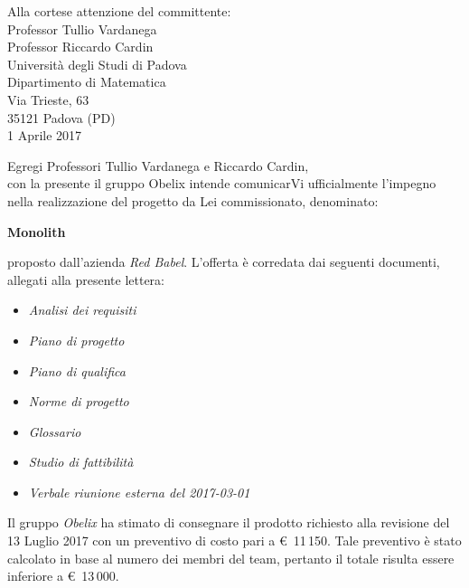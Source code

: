 \documentclass[10 pt,a4paper]{article}
\begin{document}
\begin{flushright}
  Alla cortese attenzione del committente: \\
\vspace{0.08in}
  Professor Tullio Vardanega \\
  Professor Riccardo Cardin \\
  Università degli Studi di Padova \\
  Dipartimento di Matematica \\
  Via Trieste, 63 \\
  35121 Padova (PD)\\
\vspace{0.08in}
  1 Aprile 2017 \\
\end{flushright}
\vspace{0.5in}
Egregi Professori Tullio Vardanega e Riccardo Cardin,\\
con la presente il gruppo Obelix intende comunicarVi ufficialmente
l'impegno nella realizzazione del progetto da Lei commissionato,
denominato:\\
\vspace{.05in}
\begin{centering}

  \textbf{Monolith}%
\\
\vspace{.1in}
\end{centering}
proposto dall’azienda
\emph{Red Babel}.
L'offerta è corredata dai seguenti documenti, allegati alla presente lettera:
\begin{itemize}
\item \emph{Analisi dei requisiti}
\item \emph{Piano di progetto}
\item \emph{Piano di qualifica}
\item \emph{Norme di progetto}
\item \emph{Glossario}
\item \emph{Studio di fattibilità}
\item \emph{Verbale riunione esterna del 2017-03-01}

\end{itemize}

Il gruppo \emph{Obelix} ha stimato di consegnare il prodotto richiesto
alla revisione del 13 Luglio 2017 con un preventivo di costo pari
a \euro  \, 11\,150. Tale preventivo è stato calcolato in base al numero dei membri
del team, pertanto il totale risulta essere inferiore a \euro \,  13\,000.
\end{document}
